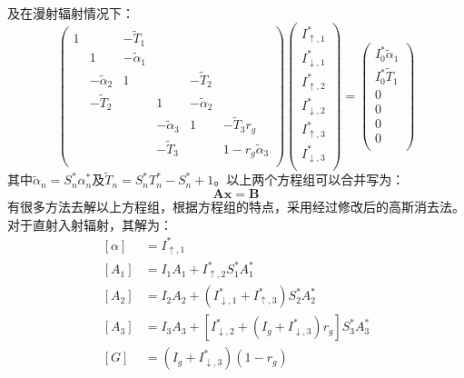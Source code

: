 及在漫射辐射情况下：
\begin{equation}
\left(\begin{matrix}1&&-{\widetilde{T}}_1&&&\\&1&-{\widetilde{\alpha}}_1&&&\\&-{\widetilde{\alpha}}_2&1&&-{\widetilde{T}}_2&\\&-{\widetilde{T}}_2&&1&-{\widetilde{\alpha}}_2&\\&&&-{\widetilde{\alpha}}_3&1&-{\widetilde{T}}_3r_g\\&&&-{\widetilde{T}}_3&&1-r_g{\widetilde{\alpha}}_3\\\end{matrix}\right)\left(\begin{matrix}I_{\uparrow,1}^\ast\\I_{\downarrow,1}^\ast\\I_{\uparrow,2}^\ast\\I_{\downarrow,2}^\ast\\I_{\uparrow,3}^\ast\\I_{\downarrow,3}^\ast\\\end{matrix}\right)=\left(\begin{matrix}I_0^\ast{\widetilde{\alpha}}_1\\I_0^\ast{\widetilde{T}}_1\\0\\0\\0\\0\\\end{matrix}\right)
\end{equation}
其中${\widetilde{\alpha}}_n=S_n^\ast\alpha_n^\ast$及${\widetilde{T}}_n=S_n^\ast T_n^\ast-S_n^\ast+1$。以上两个方程组可以合并写为：
\begin{equation}
\mathbf{A x}=\mathbf{B}
\end{equation}
有很多方法去解以上方程组，根据方程组的特点，采用经过修改后的高斯消去法。对于直射入射辐射，其解为：
\begin{equation}
\begin{aligned}
\left [\alpha \right ] &=I_{\uparrow, 1}^{*} \\[1ex] \left[A_{1}\right] &=I_{1} A_{1}+I_{\uparrow, 2}^{*} S_{1}^{*} A_{1}^{*} \\[1ex] 
\left[A_{2}\right] &=I_{2} A_{2}+\left(I_{\downarrow, 1}^{*}+I_{\uparrow, 3}^{*}\right) S_{2}^{*} A_{2}^{*} \\[1ex]
\left[A_{3}\right] &=I_{3} A_{3}+\left[I_{\downarrow, 2}^{*}+\left(I_{g}+I_{\downarrow, 3}^{*}\right) r_{g}\right] S_{3}^{*} A_{3}^{*} \\[1ex]
[G] &=\left(I_{g}+I_{\downarrow, 3}^{*}\right)\left(1-r_{g}\right)
\end{aligned}
\end{equation}
